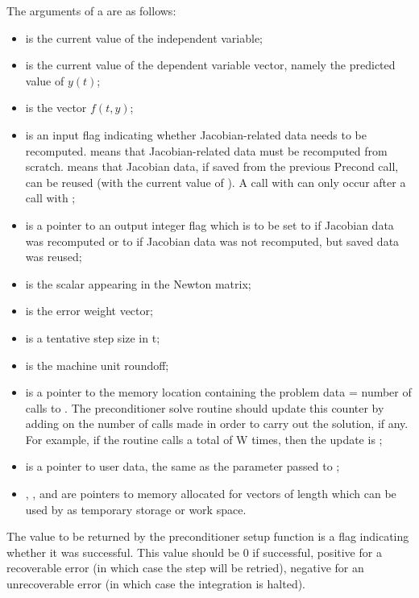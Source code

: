 \begin{itemize}
  The arguments of a  are as follows:
  \begin{itemize}
  \item 
     is the current value of the independent variable;
  \item 
     is the current value of the dependent variable vector, 
    namely the predicted value of $y(t)$;
  \item 
     is the vector $f(t,y)$;                                  
  \item 
     is an input flag indicating whether Jacobian-related   
    data needs to be recomputed.
     means that Jacobian-related data   
    must be recomputed from scratch.                                 
      means that Jacobian data, if saved from 
    the previous Precond call, can be reused      
    (with the current value of ).            
    A call with  can only occur after   
    a call with ;
  \item 
     is a pointer to an output integer flag which is        
    to be set to  if Jacobian data was recomputed or   
    to  if Jacobian data was not           
    recomputed, but saved data was reused;
  \item 
     is the scalar appearing in the Newton matrix;
  \item 
     is the error weight vector;                  
  \item 
     is a tentative step size in t;
  \item 
     is the machine unit roundoff;
  \item 
     is a pointer to the memory location containing the      
    {\cvode} problem data  = number of calls to . 
    The preconditioner solve routine should update this counter by 
    adding on the number of  calls made in order to carry out     
    the solution, if any.  For example, if the routine      
    calls  a total of W times, then the update is          
    ;
  \item 
     is a pointer to user data, the same as the       
    parameter passed to ;
  \item 
    , , and  are pointers to memory allocated    
    for vectors of length  which can be used by           
     as temporary storage or work space.    
  \end{itemize}
  
  The value to be returned by the preconditioner setup function is a flag indicating 
  whether it was successful.  This value should be $0$ if successful, 
  positive for a recoverable error (in which case the step will be retried),     
  negative for an unrecoverable error (in which case the integration is halted). 
  
\end{itemize}

